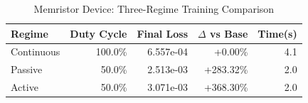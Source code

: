 \begin{table}[htbp]
\centering
\caption{Memristor Device: Three-Regime Training Comparison}
\label{tab:memristor_regimes}
\begin{tabular}{lrrrr}
\hline
Regime & Duty Cycle & Final Loss & $\Delta$ vs Base & Time(s) \\
\hline
Continuous & 100.0\% & 6.557e-04 & +0.00\% & 4.1 \\
Passive & 50.0\% & 2.513e-03 & +283.32\% & 2.0 \\
Active & 50.0\% & 3.071e-03 & +368.30\% & 2.0 \\
\hline
\end{tabular}
\end{table}
